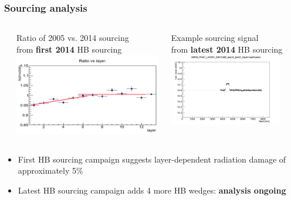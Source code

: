 \documentclass[bigger]{beamer}
\providecommand{\alert}[1]{\textbf{#1}}
\begin{document}
\begin{frame}
\frametitle{Sourcing analysis}
\label{sec-2-2-2}
\begin{columns} %
\label{sec-2-2-2-1}
\begin{column}{0.55\textwidth}
\label{sec-2-2-2-1-1}

\centering
Ratio of 2005 vs. 2014 sourcing\\
from \alert{first 2014} HB sourcing
\includegraphics[width=\textwidth]{fig/sourcing/sourcing_raddam.png}
\end{column}
\begin{column}{0.55\textwidth}
\label{sec-2-2-2-1-2}

\centering
Example sourcing signal \\
from \alert{latest 2014} HB sourcing
\includegraphics[width=0.85\textwidth]{fig/sourcing/sourcing_recent.png}
\end{column}
\end{columns}
\begin{itemize}

\item First HB sourcing campaign suggests layer-dependent radiation damage of approximately 5\%
\label{sec-2-2-2-2}%

\item Latest HB sourcing campaign adds 4 more HB wedges: \alert{analysis ongoing}
\label{sec-2-2-2-3}%
\end{itemize} %
\end{frame}
\end{document}
